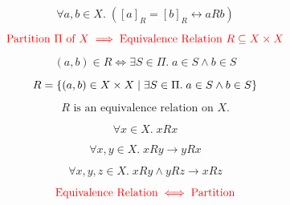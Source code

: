 \begin{frame}{}
  \begin{theorem}
    \[
      \forall a, b \in X.\; ([a]_{R} = [b]_{R} \leftrightarrow a R b)
    \]
  \end{theorem}
\end{frame}

\begin{frame}{}
  \[
    \textcolor{red}{\text{Partition } \Pi \text{ of } X \implies \text{Equivalence Relation } R \subseteq X \times X}
  \]

  \pause
  \begin{definition}
    \[
      (a, b) \in R \iff \exists S \in \Pi.\; a \in S \land b \in S
    \]

    \pause
    \vspace{-0.20cm}
    \[
      R = \{(a, b) \in X \times X \mid \exists S \in \Pi.\; a \in S \land b \in S\}
    \]
  \end{definition}

  \pause
  \begin{theorem}
    \[
      R \text{ is an equivalence relation on } X.
    \]
  \end{theorem}

  \pause
  \[
    \forall x \in X.\; xRx
  \]

  \pause
  \[
    \forall x, y \in X.\; xRy \to yRx
  \]

  \pause
  \[
    \forall x, y, z \in X.\; xRy \land yRz \to xRz
  \]
\end{frame}

\begin{frame}{}

  \[
    \textcolor{red}{\text{Equivalence Relation} \iff \text{Partition}}
  \]
\end{frame}

